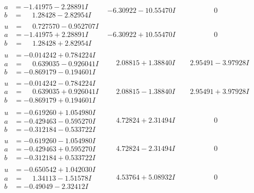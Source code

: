 \documentclass[1p]{elsarticle_modified}
\theoremstyle{definition}
\begin{document}
$$\begin{array}{c|c|c}
\begin{aligned}
a &= -1.41975 - 2.28891 I \\
b &= \phantom{-}1.28428 - 2.82954 I\end{aligned}
 & -6.30922 - 10.55470 I & \phantom{-0.000000 } 0 \\ \hline\begin{aligned}
u &= \phantom{-}0.727570 - 0.952707 I \\
a &= -1.41975 + 2.28891 I \\
b &= \phantom{-}1.28428 + 2.82954 I\end{aligned}
 & -6.30922 + 10.55470 I & \phantom{-0.000000 } 0 \\ \hline\begin{aligned}
u &= -0.014242 + 0.784224 I \\
a &= \phantom{-}0.639035 - 0.926041 I \\
b &= -0.869179 - 0.194601 I\end{aligned}
 & \phantom{-}2.08815 + 1.38840 I & \phantom{-}2.95491 - 3.97928 I \\ \hline\begin{aligned}
u &= -0.014242 - 0.784224 I \\
a &= \phantom{-}0.639035 + 0.926041 I \\
b &= -0.869179 + 0.194601 I\end{aligned}
 & \phantom{-}2.08815 - 1.38840 I & \phantom{-}2.95491 + 3.97928 I \\ \hline\begin{aligned}
u &= -0.619260 + 1.054980 I \\
a &= -0.429463 - 0.595270 I \\
b &= -0.312184 - 0.533722 I\end{aligned}
 & \phantom{-}4.72824 + 2.31494 I & \phantom{-0.000000 } 0 \\ \hline\begin{aligned}
u &= -0.619260 - 1.054980 I \\
a &= -0.429463 + 0.595270 I \\
b &= -0.312184 + 0.533722 I\end{aligned}
 & \phantom{-}4.72824 - 2.31494 I & \phantom{-0.000000 } 0 \\ \hline\begin{aligned}
u &= -0.650542 + 1.042030 I \\
a &= \phantom{-}1.34113 - 1.51578 I \\
b &= -0.49049 - 2.32412 I\end{aligned}
 & \phantom{-}4.53764 + 5.08932 I & \phantom{-0.000000 } 0 \\ \hline\begin{aligned}

\end{aligned}
\end{array}$$
\end{document}
